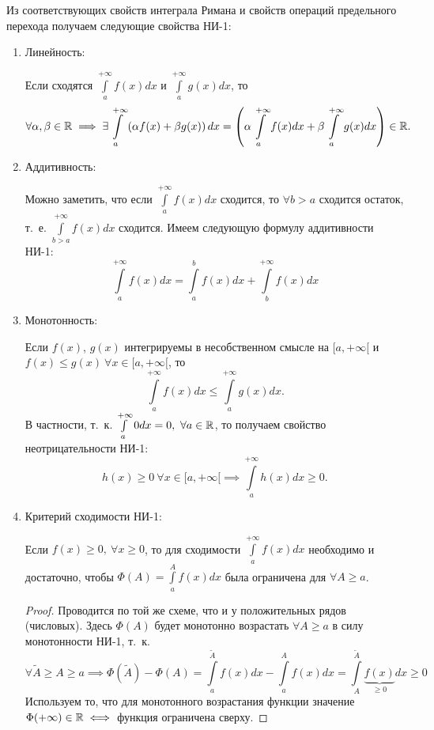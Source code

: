 \documentclass[../../main.tex]{subfiles}
\begin{document}
Из соответствующих свойств интеграла Римана и свойств операций предельного
перехода получаем следующие свойства НИ-1:
\begin{enumerate}
        \item Линейность:
        
        Если сходятся $\displaystyle\int\limits_a^{+\infty} f(x)dx$ и
        $\displaystyle\int\limits_a^{+\infty} g(x)dx$, то \[\forall \alpha, 
        \beta \in \mathbb{R}
        \implies  \exists \int\limits_a^{+\infty} \left( \alpha f(x)
        + \beta g(x) \right)dx = \left( \alpha \int\limits_a^{+\infty}
        f(x)dx + \beta \int\limits_a^{+\infty} g(x)dx \right) \in \mathbb{R}.\]
        \item Аддитивность:
        
        Можно заметить, что если $\displaystyle\int\limits_a^{+\infty} f(x)dx$ 
        сходится, то
        $\forall b>a$ сходится остаток, т.~е.
        $\displaystyle\int\limits_{b>a}^{+\infty} f(x)dx$ сходится. Имеем 
        следующую формулу
        аддитивности НИ-1:
        \[\int\limits_a^{+\infty} f(x)dx = \int\limits_a^b f(x)dx +
        \int\limits_b^{+\infty} f(x)dx \]
        \item Монотонность:
        
        Если $f(x)$, $g(x)$ интегрируемы в несобственном смысле на
        $[a, +\infty[$
        и $f(x) \leq g(x) \ {\forall x \in [a, +\infty[}$, то
        \[\int\limits_a^{+\infty} f(x)dx \leq \int\limits_a^{+\infty} g(x)dx.\]
        В частности, т.~к. $\int\limits_a^{+\infty} 0dx = 0, \ \forall a \in 
        \mathbb{R}$, то получаем свойство неотрицательности НИ-1: \[h(x) \geq 0 \ 
        \forall x \in
        [a, +\infty[ \implies \int\limits_a^{+\infty} h(x)dx \geq 0.\]
        \item Критерий сходимости НИ-1:
        
        Если $f(x) \geq 0, \ \forall x \geq 0$, то для сходимости
        $ \int\limits_a^{+\infty} f(x)dx$ необходимо и достаточно, чтобы 
        $\Phi(A) =
        \int\limits_a^{A} f(x)dx$ была ограничена для $\forall A \geq a$.
        \begin{proof}
            Проводится по той же схеме, что и у положительных рядов (числовых).
            Здесь $\Phi(A)$ будет монотонно возрастать $\forall A \geq a$
            в силу монотонности НИ-1, т.~к.
            \[\forall \tilde{A} \geq A \geq a
            \implies \Phi(\tilde{A}) - \Phi(A) =
            \int\limits_a^{\tilde{A}} f(x)dx - \int\limits_a^{A} f(x)dx =
            \int\limits_A^{\tilde{A}} \underbrace{f(x)}_{\geq 0} dx \geq 0 \]
            Используем то, что для монотонного возрастания функции значение
            $\Phi (+\infty) \in \mathbb{R} \iff$ функция ограничена сверху.
        \end{proof}
\end{enumerate}
\end{document}
